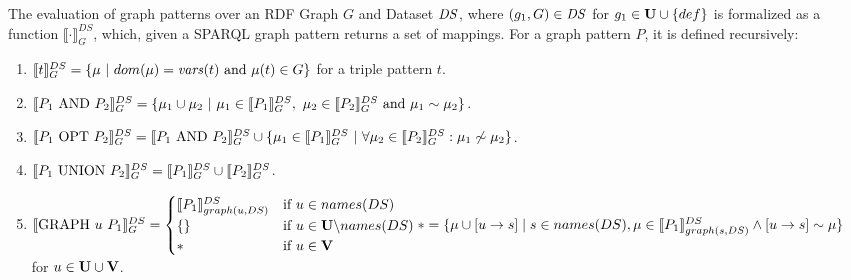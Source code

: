 \begin{definition}\label{def:sparqlsem}
	The evaluation of graph patterns over an RDF Graph $G$ and Dataset $\mathit{DS}$, where $(g_1,G) \in
	\mathit{DS}$ for $g_1 \in \mathbf{U}\cup\{def\}$ is formalized as a
	function  $\llbracket \cdot \rrbracket_G^{DS}$, which, given a SPARQL graph pattern
	returns a set of mappings.
	For a graph pattern $P$, it is defined recursively:\\
	\begin{enumerate}
		\item $\ll t \rr_G^{DS} = \{ \mu \ | \ dom(\mu) = \vars(t) \mbox{ and } \mu(t)
			\in G \}$ for a triple pattern $t$.
		\item $\llbracket P_1 \ \mbox{AND} \ P_2 \rrbracket_G^{DS} = \{ \mu_1 \cup \mu_2  \ | \ \mu_1 \in \llbracket P_1
			\rrbracket_G^{DS},  \ \mu_2 \in \llbracket P_2 \rrbracket_G^{DS} \mbox{ and } \mu_1 \sim \mu_2 \}$.
		\item $\llbracket P_1 \ \mbox{OPT} \ P_2 \rrbracket_G^{DS} = \llbracket P_1 \ \mbox{AND} \ P_2 \rrbracket_G^{DS}
			\cup \{ \mu_1 \in \llbracket P_1
			\rrbracket_G^{DS} \ | \ \forall \mu_2 \in \llbracket P_2 \rrbracket_G^{DS}: \mu_1 \not\sim \mu_2\}$.
		\item $\llbracket P_1 \ \mbox{UNION} \ P_2 \rrbracket_G^{DS} = \llbracket P_1 \rrbracket_G^{DS} \cup \llbracket P_2
			\rrbracket_G^{DS}$.
		\item  $\llbracket \mbox{GRAPH } u \ P_1 \rrbracket_G^{DS}  = 
			\begin{cases} 
				\llbracket P_1\rrbracket_{graph(u,DS)}^{DS} &\mbox{if } u \in names(DS)\\	
				\{ \}						  & \mbox{if } u \in \mathbf{U} \backslash names(DS)\\
				*					  & \mbox{if } u \in \mathbf{V}
				\end{cases}\\
				*=\{\mu \cup [u \rightarrow s] \mid s \in names(DS), \mu
					\in \llbracket P_1 \rrbracket^{DS}_{graph(s,DS)} \land [u \rightarrow s] \sim \mu
				\}	$\\ 
				for $u \in \mathbf{U} \cup \mathbf{V}$.


\end{enumerate}
\end{definition}
